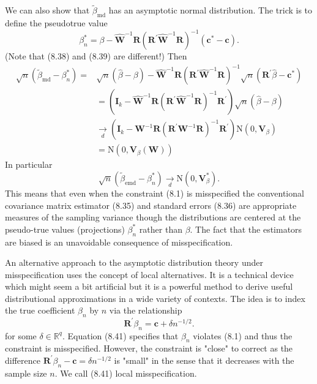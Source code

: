 \documentclass[10pt]{article}
\begin{document}
We can also show that $\widetilde{\beta}_{\mathrm{md}}$ has an asymptotic normal distribution. The trick is to define the pseudotrue value
$$
\beta_{n}^{*}=\beta-\widehat{\boldsymbol{W}}^{-1} \boldsymbol{R}\left(\boldsymbol{R}^{\prime} \widehat{\boldsymbol{W}}^{-1} \boldsymbol{R}\right)^{-1}\left(\boldsymbol{c}^{*}-\boldsymbol{c}\right) .
$$
(Note that (8.38) and (8.39) are different!) Then
$$
\begin{aligned}
\sqrt{n}\left(\widetilde{\beta}_{\mathrm{md}}-\beta_{n}^{*}\right)=& \sqrt{n}(\widehat{\beta}-\beta)-\widehat{\boldsymbol{W}}^{-1} \boldsymbol{R}\left(\boldsymbol{R}^{\prime} \widehat{\boldsymbol{W}}^{-1} \boldsymbol{R}\right)^{-1} \sqrt{n}\left(\boldsymbol{R}^{\prime} \widehat{\beta}-\boldsymbol{c}^{*}\right) \\
&=\left(\boldsymbol{I}_{k}-\widehat{\boldsymbol{W}}^{-1} \boldsymbol{R}\left(\boldsymbol{R}^{\prime} \widehat{\boldsymbol{W}}^{-1} \boldsymbol{R}\right)^{-1} \boldsymbol{R}^{\prime}\right) \sqrt{n}(\widehat{\beta}-\beta) \\
& \underset{d}{\longrightarrow}\left(\boldsymbol{I}_{k}-\boldsymbol{W}^{-1} \boldsymbol{R}\left(\boldsymbol{R}^{\prime} \boldsymbol{W}^{-1} \boldsymbol{R}\right)^{-1} \boldsymbol{R}^{\prime}\right) \mathrm{N}\left(0, \boldsymbol{V}_{\beta}\right) \\
&=\mathrm{N}\left(0, \boldsymbol{V}_{\beta}(\boldsymbol{W})\right)
\end{aligned}
$$
In particular
$$
\sqrt{n}\left(\widetilde{\beta}_{\mathrm{emd}}-\beta_{n}^{*}\right) \underset{d}{\longrightarrow} \mathrm{N}\left(0, \boldsymbol{V}_{\beta}^{*}\right) .
$$
This means that even when the constraint (8.1) is misspecified the conventional covariance matrix estimator (8.35) and standard errors (8.36) are appropriate measures of the sampling variance though the distributions are centered at the pseudo-true values (projections) $\beta_{n}^{*}$ rather than $\beta$. The fact that the estimators are biased is an unavoidable consequence of misspecification.

An alternative approach to the asymptotic distribution theory under misspecification uses the concept of local alternatives. It is a technical device which might seem a bit artificial but it is a powerful method to derive useful distributional approximations in a wide variety of contexts. The idea is to index the true coefficient $\beta_{n}$ by $n$ via the relationship
$$
\boldsymbol{R}^{\prime} \beta_{n}=\boldsymbol{c}+\delta n^{-1 / 2} .
$$
for some $\delta \in \mathbb{R}^{q}$. Equation (8.41) specifies that $\beta_{n}$ violates (8.1) and thus the constraint is misspecified. However, the constraint is "close" to correct as the difference $\boldsymbol{R}^{\prime} \beta_{n}-\boldsymbol{c}=\delta n^{-1 / 2}$ is "small" in the sense that it decreases with the sample size $n$. We call (8.41) local misspecification.
\end{document}
